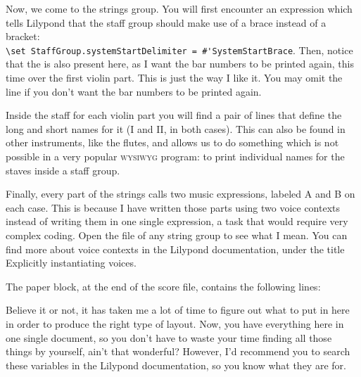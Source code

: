 \documentclass[../../LilyPond-Tutorials]{subfiles}
\begin{document}
Now, we come to the strings group.
You will first encounter an expression which tells Lilypond that the staff group should make use of a brace instead of a bracket:\\
\verb|\set StaffGroup.systemStartDelimiter = #'SystemStartBrace|.
Then, notice that the  is also present here, as I want the bar numbers to be printed again, this time over the first violin part.
This is just the way I like it.
You may omit the line if you don't want the bar numbers to be printed again.

Inside the staff for each violin part you will find a pair of lines that define the long and short names for it (I and II, in both cases).
This can also be found in other instruments, like the flutes, and allows us to do something which is not possible in a very popular \textsc{wysiwyg} program: to print individual names for the staves inside a staff group.

Finally, every part of the strings calls two music expressions, labeled A and B on each case.
This is because I have written those parts using two voice contexts instead of writing them in one single expression, a task that would require very complex coding.
Open the file of any string group to see what I mean.
You can find more about voice contexts in the Lilypond documentation, under the title Explicitly instantiating voices.

The paper block, at the end of the score file, contains the following lines:

\begin{lilypondcode}
\end{lilypondcode}

Believe it or not, it has taken me a lot of time to figure out what to put in here in order to produce the right type of layout.
Now, you have everything here in one single document, so you don't have to waste your time finding all those things by yourself, ain't that wonderful?
However, I'd recommend you to search these variables in the Lilypond documentation, so you know what they are for.
\end{document}
